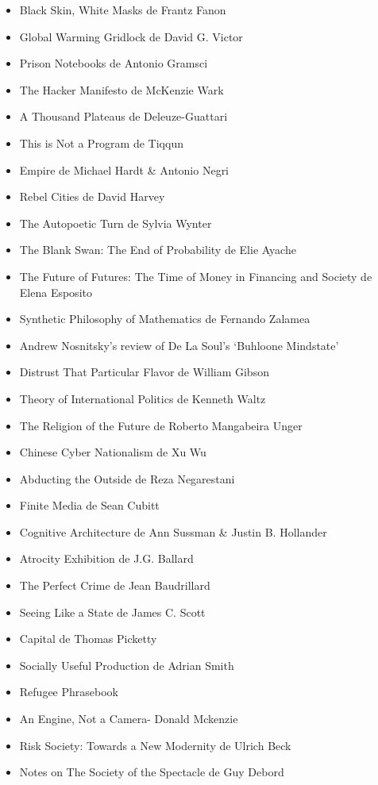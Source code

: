 \begin{itemize}
  \item Black Skin, White Masks de Frantz Fanon
  \item Global Warming Gridlock de David G. Victor
  \item Prison Notebooks de Antonio Gramsci
  \item The Hacker Manifesto de McKenzie Wark
  \item A Thousand Plateaus de Deleuze-Guattari
  \item This is Not a Program de Tiqqun
  \item Empire de Michael Hardt \& Antonio Negri
  \item Rebel Cities de David Harvey
  \item The Autopoetic Turn de Sylvia Wynter
  \item The Blank Swan: The End of Probability de Elie Ayache
  \item The Future of Futures: The Time of Money in Financing and Society de Elena Esposito
  \item Synthetic Philosophy of Mathematics de Fernando Zalamea
  \item Andrew Nosnitsky's review of De La Soul's `Buhloone Mindstate'
  \item Distrust That Particular Flavor de William Gibson
  \item Theory of International Politics de Kenneth Waltz
  \item The Religion of the Future de Roberto Mangabeira Unger
  \item Chinese Cyber Nationalism de Xu Wu
  \item Abducting the Outside de Reza Negarestani
  \item Finite Media de Sean Cubitt
  \item Cognitive Architecture de Ann Sussman \& Justin B. Hollander
  \item Atrocity Exhibition de J.G. Ballard
  \item The Perfect Crime de Jean Baudrillard
  \item Seeing Like a State de James C. Scott
  \item Capital de Thomas Picketty
  \item Socially Useful Production de Adrian Smith
  \item Refugee Phrasebook
  \item An Engine, Not a Camera- Donald Mckenzie
  \item Risk Society: Towards a New Modernity de Ulrich Beck
  \item Notes on The Society of the Spectacle de Guy Debord

\end{itemize}
